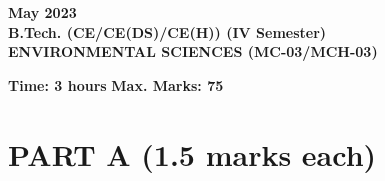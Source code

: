 \documentclass[12pt,a4paper]{article}
\begin{document}
\pagecolor{pagecolor}

\begin{center}
    \textbf{May 2023} \\
    \textbf{B.Tech. (CE/CE(DS)/CE(H)) (IV Semester)} \\
    \textbf{ENVIRONMENTAL SCIENCES (MC-03/MCH-03)}
\end{center}

\vspace{1em}

\noindent \textbf{Time: 3 hours} \hfill \textbf{Max. Marks: 75}

\vspace{1em}

\section*{\textbf{PART A (1.5 marks each)}}
\end{document}

